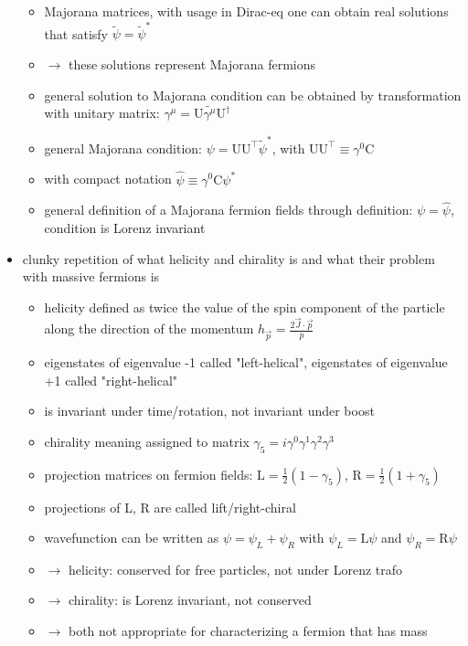 \begin{itemize}
\begin{itemize}
\item Majorana matrices, with usage in Dirac-eq one can obtain real solutions that satisfy \(\tilde{\psi} = \tilde{\psi}^*\)
\item \(\rightarrow\) these solutions represent Majorana fermions
\item general solution to Majorana condition can be obtained by transformation with unitary matrix: \(\gamma^\mu = \mathrm{U}\tilde{\gamma^\mu}\mathrm{U}^\dagger\)
\item general Majorana condition: \(\psi = \mathrm{U}\mathrm{U}^\top\tilde{\psi}^*\), with \(\mathrm{U}\mathrm{U}^\top \equiv \gamma^0 \mathrm{C}\)
\item with compact notation \(\widehat{\psi} \equiv \gamma^0 \mathrm{C} \psi^*\)
\item general definition of a Majorana fermion fields through definition: \(\psi = \widehat{\psi}\), condition is Lorenz invariant
\end{itemize}
\item clunky repetition of what helicity and chirality is and what their problem with massive fermions is
\begin{itemize}
\item helicity defined as twice the value of the spin component of the particle along the direction of the momentum \(h_{\vec{p}} = \frac{2 \vec{J} \cdot \vec{p}}{p}\)
\item eigenstates of eigenvalue -1 called "left-helical", eigenstates of eigenvalue +1 called "right-helical"
\item is invariant under time/rotation, not invariant under boost
\item chirality meaning assigned to matrix \(\gamma_5 = i\gamma^0\gamma^1\gamma^2\gamma^3\)
\item projection matrices on fermion fields: \( \mathrm{L} = \frac{1}{2} \left( 1- \gamma_5\right ) \), \( \mathrm{R} = \frac{1}{2} \left( 1 + \gamma_5\right ) \)
\item projections of L, R are called lift/right-chiral
\item wavefunction can be written as \(\psi = \psi_L + \psi_R\) with \(\psi_L = \mathrm{L}\psi\) and \(\psi_R = \mathrm{R}\psi\)
\item \(\rightarrow\) helicity: conserved for free particles, not under Lorenz trafo
\item \(\rightarrow\) chirality: is Lorenz invariant, not conserved
\item \(\rightarrow\) both not appropriate for characterizing a fermion that has mass

\end{itemize}
\end{itemize}
